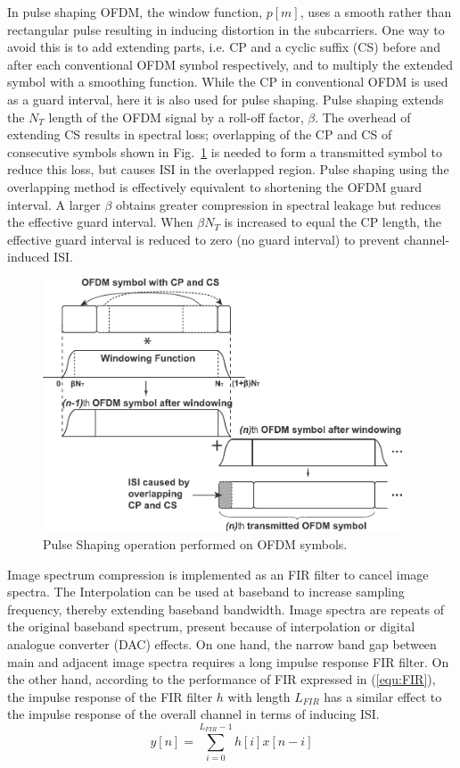In pulse shaping OFDM, the window function, $p[m]$, uses a smooth rather than rectangular pulse resulting in inducing distortion in the subcarriers.
One way to avoid this is to add extending parts, i.e. CP and a cyclic suffix (CS) before and after each conventional OFDM symbol respectively, and to multiply the extended symbol with a smoothing function.
While the CP in conventional OFDM is used as a guard interval, here it is also used for pulse shaping. Pulse shaping extends the  $N_{T}$ length of the OFDM signal by a roll-off factor, $\beta$.
The overhead of extending CS results in spectral loss; overlapping of the CP and CS of consecutive symbols shown in Fig.~\ref{fig:PS} is needed to form a transmitted symbol to reduce this loss, but causes ISI in the overlapped region. Pulse shaping using the overlapping method is effectively equivalent to shortening the OFDM guard interval.
A larger $\beta$ obtains greater compression in spectral leakage but reduces the effective guard interval.
When $\beta N_{T}$ is increased to equal the CP length, the effective guard interval is reduced to zero (no guard interval) to prevent channel-induced ISI.

\begin{figure}[t]
    \centerline{\includegraphics [width=0.9\columnwidth, height=7.5cm] {./Figures/w-ofdm.pdf} }
	\vspace{-2mm}
    \caption{Pulse Shaping operation performed on OFDM symbols.}
    \label{fig:PS}
\end{figure}

Image spectrum compression is implemented as an FIR filter to cancel image spectra.
The Interpolation can be used at baseband to increase sampling frequency, thereby extending baseband bandwidth.
Image spectra are repeats of the original baseband spectrum, present because of interpolation or digital analogue converter (DAC) effects.
On one hand, the narrow band gap between main and adjacent image spectra requires a long impulse response FIR filter.
On the other hand, according to the performance of FIR expressed in (\ref{equ:FIR}), the impulse response of the FIR filter $h$ with length $L_{FIR}$ has a similar effect to the impulse response of the overall channel in terms of inducing ISI.
\begin{equation}
\label{equ:FIR}
y[n] =  \sum_{i=0}^{L_{FIR}-1} h[i]x[n-i] 
\end{equation}

